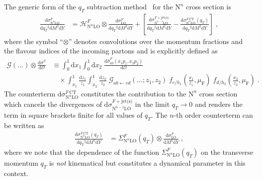 \documentclass[12pt]{article}
\DeclareRobustCommand{\muf}{\ensuremath{\mu_{\mathrm{F}}}\xspace}
\DeclareRobustCommand{\qt}{\ensuremath{q_T}\xspace}
\DeclareRobustCommand{\rd}{\ensuremath{\mathrm{d}}}
\DeclareRobustCommand{\cO}{\ensuremath{\mathcal{O}}}
\DeclareRobustCommand{\cG}{\ensuremath{\mathcal{G}}}
\DeclareRobustCommand{\cH}{\ensuremath{\mathcal{H}}}
\DeclareRobustCommand{\obs}{\cO\xspace}
\DeclareRobustCommand{\jets}{\text{jet(s)}\xspace}
\DeclareRobustCommand{\CT}{\text{CT}\xspace}
\DeclareRobustCommand{\LO}{\text{LO}\xspace}
\DeclareRobustCommand{\N}[1]{\ensuremath{\text{N}^{#1}}} %
\begin{document}
The generic form of the $\qt$ subtraction method~\cite{Catani:2007vq} for the \N{n}\LO cross section is
\begin{align}
  \frac{\rd\sigma^{F}_{\N{n}\LO}}{\rd\qt^2\rd M^2\rd Y}
  &=
  \cH^F_{\N{n}\LO} \otimes
  \frac{\rd\sigma^{F}_{\LO}}{\rd\qt^2\rd M^2\rd Y} +
  \left[ 
    \frac{\rd\sigma^{F+\jets}_{\N{n-1}\LO}}{\rd\qt^2\rd M^2\rd Y} -
    \frac{\rd\sigma^{F\,\CT}_{\N{n}\LO}(\qt)}{\rd\qt^2\rd M^2\rd Y}
  \right] \;,
  \label{eq:master}
\end{align}
where the symbol ``$\otimes$'' denotes convolutions over the momentum fractions and the flavour indices of the incoming partons and is explicitly defined as
\begin{align}
  \cG(\dots) \otimes \frac{\rd\sigma^{F}}{\rd\obs} 
  &\equiv
  \int_0^1\rd x_1 \int_0^1\rd x_2 \;
  \frac{\rd\hat{\sigma}^{F}_{ab}(x_1 p_1, x_2 p_2)}{\rd\obs}
  \nonumber\\&\quad
  \times 
  \int_{x_1}^1 \frac{\rd z_1}{z_1} \int_{x_2}^1 \frac{\rd z_2}{z_2} \; 
  \cG_{ab \gets cd}(\ldots; z_1, z_2) \;
  f_{c/h_1}\left(\frac{x_1}{z_1},\muf\right) \; f_{d/h_2}\left(\frac{x_2}{z_2},\muf\right) \;.
\end{align}
The counterterm $\rd\sigma^{F\,\CT}_{\N{n}\LO}$ constitutes the contribution to the \N{n}\LO cross section which cancels the divergences of $\rd\sigma^{F+\jets}_{\N{n-1}\LO}$ in the limit $\qt \rightarrow 0$ and renders the term in square brackets finite for all values of $\qt$. 
The $n$-th order counterterm can be written as
\begin{align}
  \frac{\rd\sigma^{F\,\CT}_{\N{n}\LO}(\qt)}{\rd\qt^2\rd M^2\rd Y}
  &=
  \Sigma^F_{\N{n}\LO}(\qt) \otimes
  \frac{\rd\sigma^{F}_{\LO}}{\rd M^2\rd Y} \;,
  \label{eq:CT}
\end{align}
where we note that the dependence of the function $\Sigma^{F}_{\N{n}\LO}(\qt)$ on the transverse momentum $\qt$ is \emph{not} kinematical but constitutes a dynamical parameter in this context.
\end{document}
